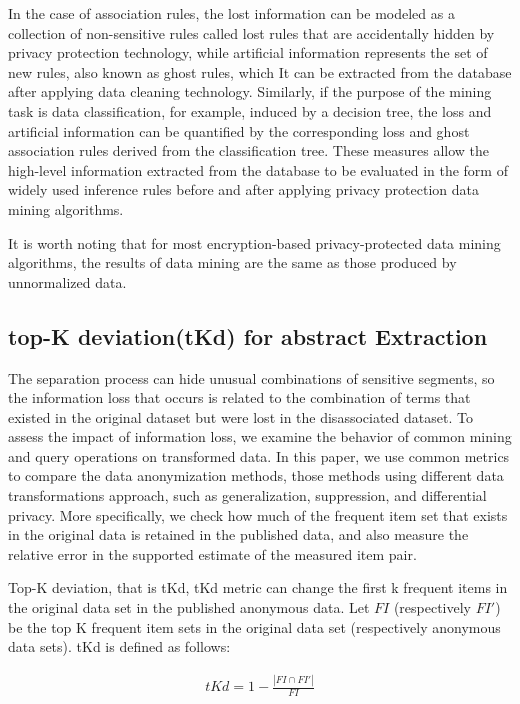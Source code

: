 \documentclass[journal,transmag]{IEEEtran}
\begin{document}
In the case of association rules, the lost information can be modeled as a collection of non-sensitive rules called lost rules that are accidentally hidden by privacy protection technology, while artificial information represents the set of new rules, also known as ghost rules, which It can be extracted from the database after applying data cleaning technology. Similarly, if the purpose of the mining task is data classification, for example, induced by a decision tree, the loss and artificial information can be quantified by the corresponding loss and ghost association rules derived from the classification tree. These measures allow the high-level information extracted from the database to be evaluated in the form of widely used inference rules before and after applying privacy protection data mining algorithms.

It is worth noting that for most encryption-based privacy-protected data mining algorithms, the results of data mining are the same as those produced by unnormalized data.


\subsection{top-K deviation(tKd) for abstract Extraction}
The separation process can hide unusual combinations of sensitive segments, so the information loss that occurs is related to the combination of terms that existed in the original dataset but were lost in the disassociated dataset. To assess the impact of information loss, we examine the behavior of common mining and query operations on transformed data. In this paper, we use common metrics to compare the data anonymization methods, those methods using different data transformations approach, such as generalization, suppression, and differential privacy. More specifically, we check how much of the frequent item set that exists in the original data is retained in the published data, and also measure the relative error in the supported estimate of the measured item pair.


Top-K deviation, that is tKd, tKd metric can change the first k frequent items in the original data set in the published anonymous data. Let $ FI $ (respectively $ FI '$) be the top K frequent item sets in the original data set (respectively anonymous data sets). tKd is defined as follows:

\begin{eqnarray}\label{equ:tkd2xdfg}
tKd= 1 - \frac{|FI\cap FI'|}{FI} 
\end{eqnarray}
\end{document}
